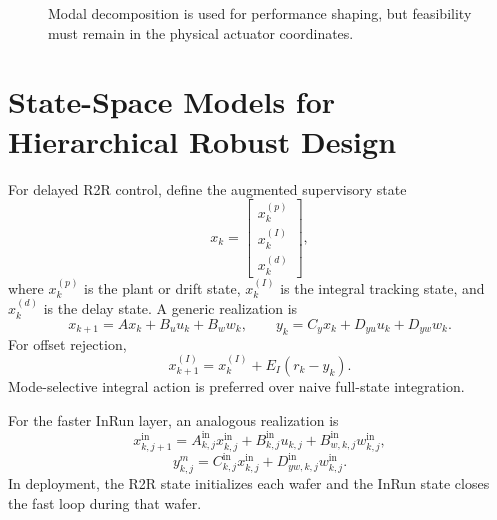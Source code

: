 \documentclass[11pt,a4paper]{article}
\newcommand{\R}{\mathbb{R}}
\begin{document}
\begin{figure}[h!]
\centering
{}
\caption{Modal decomposition is used for performance shaping, but feasibility must remain in the physical actuator coordinates.}
\end{figure}

\section{State-Space Models for Hierarchical Robust Design}
For delayed R2R control, define the augmented supervisory state
\[
x_k=\begin{bmatrix}x_k^{(p)}\\x_k^{(I)}\\x_k^{(d)}\end{bmatrix},
\]
where $x_k^{(p)}$ is the plant or drift state, $x_k^{(I)}$ is the integral tracking state, and $x_k^{(d)}$ is the delay state. A generic realization is
\[
x_{k+1}=Ax_k+B_u u_k+B_w w_k,\qquad y_k=C_yx_k+D_{yu}u_k+D_{yw}w_k.
\]
For offset rejection,
\[
x_{k+1}^{(I)}=x_k^{(I)}+E_I(r_k-y_k).
\]
Mode-selective integral action is preferred over naive full-state integration.

For the faster InRun layer, an analogous realization is
\[
x^{\mathrm{in}}_{k,j+1}=A^{\mathrm{in}}_{k,j}x^{\mathrm{in}}_{k,j}+B^{\mathrm{in}}_{k,j}u_{k,j}+B^{\mathrm{in}}_{w,k,j}w^{\mathrm{in}}_{k,j},
\]
\[
y^m_{k,j}=C^{\mathrm{in}}_{k,j}x^{\mathrm{in}}_{k,j}+D^{\mathrm{in}}_{yw,k,j}w^{\mathrm{in}}_{k,j}.
\]
In deployment, the R2R state initializes each wafer and the InRun state closes the fast loop during that wafer.
\end{document}
